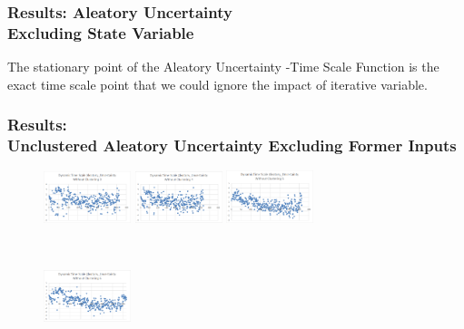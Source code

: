 \documentclass{beamer}
\begin{document}
\begin{frame}
\frametitle{Results: Aleatory Uncertainty\\Excluding State Variable}
The stationary point of the Aleatory Uncertainty -Time Scale Function is the exact time scale point that we could ignore the impact of iterative variable.
\end{frame}


\begin{frame}
\frametitle{Results:\\Unclustered Aleatory Uncertainty Excluding Former Inputs}
\begin{figure} 
  \centering 
  \begin{minipage}[b]{0.2\textwidth} 
    \centering 
    \includegraphics[width=1in]{unclustered3.png} 
  \end{minipage}%
  \hspace{0.04\linewidth}%
  \begin{minipage}[b]{0.2\textwidth} 
    \centering 
    \includegraphics[width=1in]{unclustered4.png} 
  \end{minipage}
  \hspace{0.04\linewidth}%
  \begin{minipage}[b]{0.2\textwidth} 
    \centering 
    \includegraphics[width=1in]{unclustered5.png} 
  \end{minipage} \\[20pt] 
  \begin{minipage}[b]{0.2\textwidth} 
    \centering 
    \includegraphics[width=1in]{unclustered6.png}  
  \end{minipage}%
  \hspace{0.04\linewidth}%
  \begin{minipage}[b]{0.2\textwidth} 

\end{minipage}
\end{figure}
\end{frame}
\end{document}
